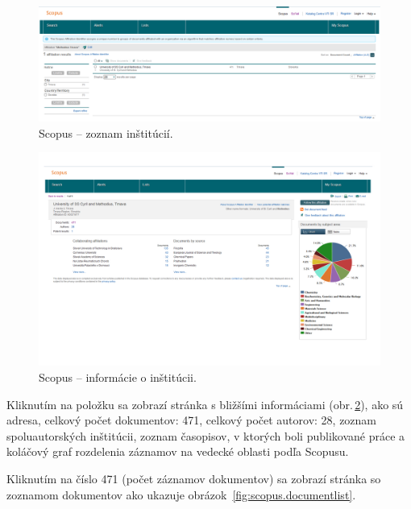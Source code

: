 \begin{figure}
  \centering
  \includegraphics[width=\textwidth]{obr/scopus02-cut.jpg}
  \caption{Scopus -- zoznam inštitúcií.}
  \label{fig:scopus.institutionlist}
\end{figure}

\begin{figure}
  \centering
  \includegraphics[width=\textwidth]{obr/scopus03-cut.jpg}
  \caption{Scopus -- informácie o inštitúcii.}
  \label{fig:scopus.institutioninfo}
\end{figure}

Kliknutím na položku sa zobrazí stránka s bližšími informáciami
(obr.\,\ref{fig:scopus.institutioninfo}), ako sú adresa, celkový počet
dokumentov: 471, celkový počet autorov: 28, zoznam spoluautorských inštitúcii,
zoznam časopisov, v ktorých boli publikované práce a koláčový graf rozdelenia
záznamov na vedecké oblasti podľa Scopusu.

Kliknutím na číslo 471 (počet záznamov dokumentov) sa zobrazí stránka so
zoznamom dokumentov ako ukazuje obrázok~\ref{fig:scopus.documentlist}.

